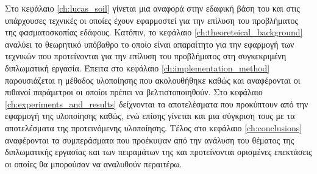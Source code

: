Στο κεφάλαιο \ref{ch:lucas_soil} γίνεται μια αναφορά στην εδαφική βάση του  και στις υπάρχουσες τεχνικές οι οποίες έχουν εφαρμοστεί για την επίλυση του προβλήματος της φασματοσκοπίας εδάφους. Κατόπιν, το κεφάλαιο \ref{ch:theoreteical_background} αναλύει το θεωρητικό υπόβαθρο το οποίο είναι απαραίτητο για την εφαρμογή των τεχνικών που προτείνονται για την επίλυση του προβλήματος στη συγκεκριμένη διπλωματική εργασία. Έπειτα στο κεφάλαιο \ref{ch:implementation_method} παρουσιάζεται η μέθοδος υλοποίησης που ακολουθήθηκε καθώς και αναφέρονται οι πιθανοί παράμετροι οι οποίοι πρέπει να βελτιστοποιηθούν. Στο κεφάλαιο \ref{ch:experiments_and_results} δείχνονται τα αποτελέσματα που προκύπτουν από την εφαρμογή της υλοποίησης καθώς, ενώ επίσης γίνεται και μια σύγκριση τους με τα αποτελέσματα της προτεινόμενης υλοποίησης. Τέλος στο κεφάλαιο \ref{ch:conclusions} αναφέρονται τα συμπεράσματα που προέκυψαν από την ανάλυση του θέματος της διπλωματικής εργασίας και των πειραμάτων της και προτείνονται ορισμένες επεκτάσεις οι οποίες θα μπορούσαν να αναλυθούν περαιτέρω.